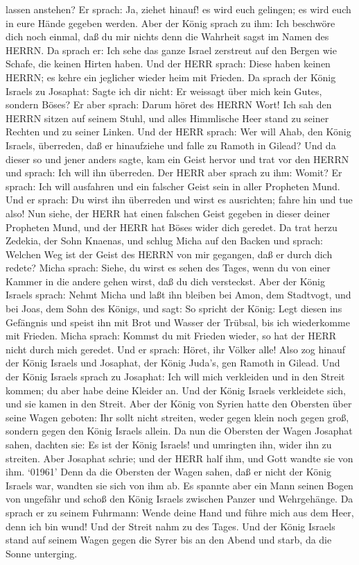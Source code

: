 lassen anstehen? Er sprach: Ja, ziehet hinauf! es wird euch gelingen; es
wird euch in eure Hände gegeben werden.  Aber der König
sprach zu ihm: Ich beschwöre dich noch einmal, daß du mir nichts denn
die Wahrheit sagst im Namen des HERRN.  Da sprach er: Ich
sehe das ganze Israel zerstreut auf den Bergen wie Schafe, die keinen
Hirten haben. Und der HERR sprach: Diese haben keinen HERRN; es kehre
ein jeglicher wieder heim mit Frieden.  Da sprach der König
Israels zu Josaphat: Sagte ich dir nicht: Er weissagt über mich kein
Gutes, sondern Böses?  Er aber sprach: Darum höret des
HERRN Wort! Ich sah den HERRN sitzen auf seinem Stuhl, und alles
Himmlische Heer stand zu seiner Rechten und zu seiner Linken.
 Und der HERR sprach: Wer will Ahab, den König Israels,
überreden, daß er hinaufziehe und falle zu Ramoth in Gilead? Und da
dieser so und jener anders sagte,  kam ein Geist hervor und
trat vor den HERRN und sprach: Ich will ihn überreden. Der HERR aber
sprach zu ihm: Womit?  Er sprach: Ich will ausfahren und
ein falscher Geist sein in aller Propheten Mund. Und er sprach: Du wirst
ihn überreden und wirst es ausrichten; fahre hin und tue also!
 Nun siehe, der HERR hat einen falschen Geist gegeben in
dieser deiner Propheten Mund, und der HERR hat Böses wider dich geredet.
 Da trat herzu Zedekia, der Sohn Knaenas, und schlug Micha
auf den Backen und sprach: Welchen Weg ist der Geist des HERRN von mir
gegangen, daß er durch dich redete?  Micha sprach: Siehe,
du wirst es sehen des Tages, wenn du von einer Kammer in die andere
gehen wirst, daß du dich versteckst.  Aber der König
Israels sprach: Nehmt Micha und laßt ihn bleiben bei Amon, dem
Stadtvogt, und bei Joas, dem Sohn des Königs,  und sagt: So
spricht der König: Legt diesen ins Gefängnis und speist ihn mit Brot und
Wasser der Trübsal, bis ich wiederkomme mit Frieden.  Micha
sprach: Kommst du mit Frieden wieder, so hat der HERR nicht durch mich
geredet. Und er sprach: Höret, ihr Völker alle!  Also zog
hinauf der König Israels und Josaphat, der König Juda's, gen Ramoth in
Gilead.  Und der König Israels sprach zu Josaphat: Ich will
mich verkleiden und in den Streit kommen; du aber habe deine Kleider an.
Und der König Israels verkleidete sich, und sie kamen in den Streit.
 Aber der König von Syrien hatte den Obersten über seine
Wagen geboten: Ihr sollt nicht streiten, weder gegen klein noch gegen
groß, sondern gegen den König Israels allein.  Da nun die
Obersten der Wagen Josaphat sahen, dachten sie: Es ist der König
Israels! und umringten ihn, wider ihn zu streiten. Aber Josaphat schrie;
und der HERR half ihm, und Gott wandte sie von ihm. 
`01961' Denn da die Obersten der Wagen sahen, daß er nicht der König
Israels war, wandten sie sich von ihm ab.  Es spannte aber
ein Mann seinen Bogen von ungefähr und schoß den König Israels zwischen
Panzer und Wehrgehänge. Da sprach er zu seinem Fuhrmann: Wende deine
Hand und führe mich aus dem Heer, denn ich bin wund!  Und
der Streit nahm zu des Tages. Und der König Israels stand auf seinem
Wagen gegen die Syrer bis an den Abend und starb, da die Sonne
unterging.


